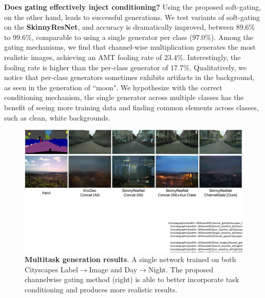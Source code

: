 \vspace{2mm} \noindent \textbf{Does gating effectively inject conditioning?} Using the proposed soft-gating, on the other hand, leads to successful generations. We test variants of soft-gating on the \textbf{SkinnyResNet}, and accuracy is dramatically improved, between $89.6\%$ to $99.6\%$, comparable to using a single generator per class ($97.0\%$).
Among the gating mechanisms, we find that channel-wise multiplication
generates the most realistic images, achieving an AMT fooling rate of $23.4\%$. Interestingly, the fooling rate is higher than the per-class generator of $17.7\%$. Qualitatively, we notice that per-class generators sometimes exhibits artifacts in the background, as seen in the generation of ``moon". We hypothesize with the correct conditioning mechanism, the single generator across multiple classes has the benefit of seeing more training data and finding common elements across classes, such as clean, white backgrounds.



\begin{figure}[h]
    \centering
    \includegraphics[width=1.\linewidth]{paper_images/multitask_comp.pdf}
    \caption{\textbf{Multitask generation results}. A single network trained on both Cityscapes Label$\rightarrow$Image and Day$\rightarrow$Night. The proposed channelwise gating method (right) is able to better incorporate task conditioning and produces more realistic results.
    }
    \label{fig:multi-task_day2night}
    \vspace{-2mm}
\end{figure}

